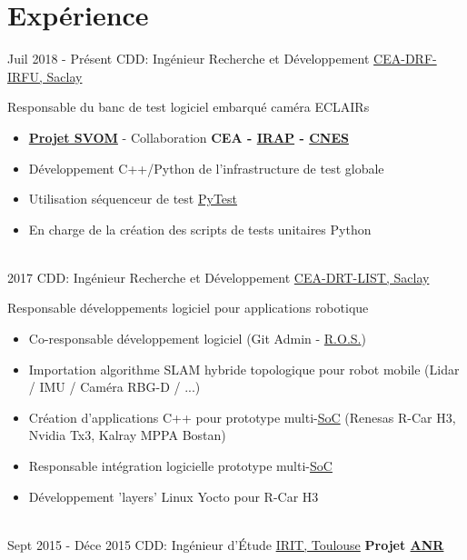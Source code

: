 \documentclass[letterpaper]{twentysecondcv} %
\begin{document}
\section{Expérience}
\begin{twenty} %
  \twentyitem
  {Juil 2018 -}
  {Présent}
  {CDD: Ingénieur Recherche et Développement}
  {\href{http://www.cea.fr/}{CEA-DRF-IRFU, Saclay}}
  {}
  {
    Responsable du banc de test logiciel embarqué caméra ECLAIRs
    \begin{itemize}
    \item \textbf{\href{http://www.svom.fr/}{Projet SVOM}} - Collaboration
      \textbf{CEA - \href{http://www.irap.omp.eu/}{IRAP} - \href{https://cnes.fr/fr}{CNES} }     
    \item Développement C++/Python de l'infrastructure de test globale
    \item Utilisation séquenceur de test \href{https://docs.pytest.org/en/latest/contents.html}{PyTest}
    \item En charge de la création des scripts de tests unitaires Python
    \end{itemize}
  }
  \\
  \twentyitem
  {2017}
  {}
  {CDD: Ingénieur Recherche et Développement}
  {\href{http://www.cea.fr/}{CEA-DRT-LIST, Saclay}}
  {}
  {
    Responsable développements logiciel pour applications robotique
    \begin{itemize}
    \item Co-responsable développement logiciel (Git Admin - \href{http://www.ros.org/}{R.O.S.})
    \item Importation algorithme SLAM hybride topologique pour robot mobile (Lidar / IMU / Caméra RBG-D / ...)
    \item Création d'applications C++ pour prototype
      multi-\href{https://en.wikipedia.org/wiki/System_on_a_chip}{SoC} (Renesas R-Car
      H3, Nvidia Tx3, Kalray MPPA Bostan)
    \item Responsable intégration logicielle prototype
      multi-\href{https://en.wikipedia.org/wiki/System_on_a_chip}{SoC}
    \item Développement 'layers' Linux Yocto pour R-Car H3
    \end{itemize}
  }
  \\
  \twentyitem
  {Sept 2015 -}
  {Déce 2015}
  {CDD: Ingénieur d'Étude}
  {\href{http://www.cea.fr/}{IRIT, Toulouse}}
  {}
  {
    \textbf{Projet
      \href{http://www.agence-nationale-recherche.fr/Project-ANR-12-CORD-0003}{ANR
}}}
\end{twenty}
\end{document}
